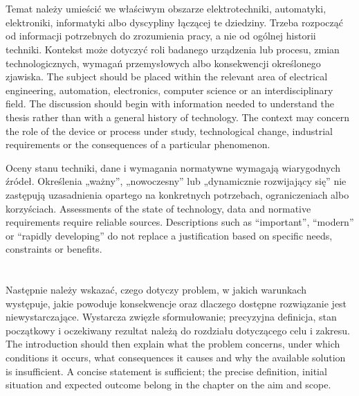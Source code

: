 \section{}

\ploren
  {Temat należy umieścić we właściwym obszarze elektrotechniki, automatyki, elektroniki, informatyki albo dyscypliny łączącej te dziedziny. Trzeba rozpocząć od informacji potrzebnych do zrozumienia pracy, a nie od ogólnej historii techniki. Kontekst może dotyczyć roli badanego urządzenia lub procesu, zmian technologicznych, wymagań przemysłowych albo konsekwencji określonego zjawiska.}
  {The subject should be placed within the relevant area of electrical engineering, automation, electronics, computer science or an interdisciplinary field. The discussion should begin with information needed to understand the thesis rather than with a general history of technology. The context may concern the role of the device or process under study, technological change, industrial requirements or the consequences of a particular phenomenon.}

\ploren
  {Oceny stanu techniki, dane i wymagania normatywne wymagają wiarygodnych źródeł. Określenia „ważny”, „nowoczesny” lub „dynamicznie rozwijający się” nie zastępują uzasadnienia opartego na konkretnych potrzebach, ograniczeniach albo korzyściach.}
  {Assessments of the state of technology, data and normative requirements require reliable sources. Descriptions such as “important”, “modern” or “rapidly developing” do not replace a justification based on specific needs, constraints or benefits.}

\section{}

\ploren
  {Następnie należy wskazać, czego dotyczy problem, w jakich warunkach występuje, jakie powoduje konsekwencje oraz dlaczego dostępne rozwiązanie jest niewystarczające. Wystarcza zwięzłe sformułowanie; precyzyjna definicja, stan początkowy i oczekiwany rezultat należą do rozdziału dotyczącego celu i zakresu.}
  {The introduction should then explain what the problem concerns, under which conditions it occurs, what consequences it causes and why the available solution is insufficient. A concise statement is sufficient; the precise definition, initial situation and expected outcome belong in the chapter on the aim and scope.}


